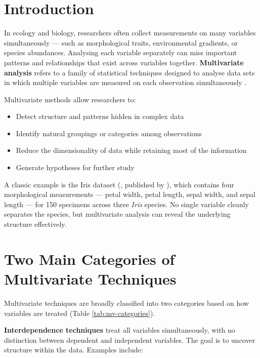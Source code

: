 \documentclass[
]{book}
\providecommand{\tightlist}{%
  \setlength{\itemsep}{0pt}\setlength{\parskip}{0pt}}
\begin{document}
\section{Introduction}\label{introduction-12}

In ecology and biology, researchers often collect measurements on many variables simultaneously --- such as morphological traits, environmental gradients, or species abundances. Analysing each variable separately can miss important patterns and relationships that exist across variables together. \textbf{Multivariate analysis} refers to a family of statistical techniques designed to analyse data sets in which multiple variables are measured on each observation simultaneously \citep{gotelli2013}.

Multivariate methods allow researchers to:

\begin{itemize}
\tightlist
\item
  Detect structure and patterns hidden in complex data
\item
  Identify natural groupings or categories among observations
\item
  Reduce the dimensionality of data while retaining most of the information
\item
  Generate hypotheses for further study
\end{itemize}

A classic example is the Iris dataset (\citet{Anderson1935}, published by \citet{Fisher1936}), which contains four morphological measurements --- petal width, petal length, sepal width, and sepal length --- for 150 specimens across three \emph{Iris} species. No single variable cleanly separates the species, but multivariate analysis can reveal the underlying structure effectively.

\section{Two Main Categories of Multivariate Techniques}\label{two-main-categories-of-multivariate-techniques}

Multivariate techniques are broadly classified into two categories based on how variables are treated (Table \ref{tab:mv-categories}).

\textbf{Interdependence techniques} treat all variables simultaneously, with no distinction between dependent and independent variables. The goal is to uncover structure within the data. Examples include:
\end{document}
